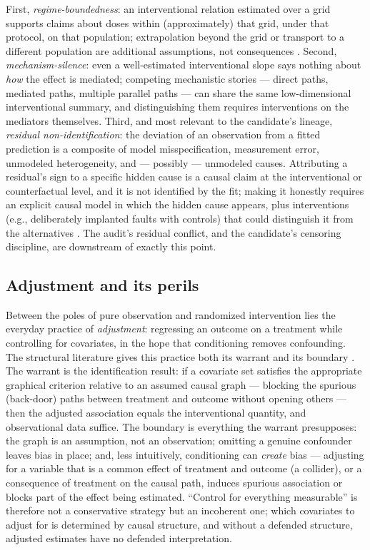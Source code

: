 First, \emph{regime-boundedness}: an interventional relation estimated over a grid supports claims about doses within (approximately) that grid, under that protocol, on that population; extrapolation beyond the grid or transport to a different population are additional assumptions, not consequences \cite{pearl}. Second, \emph{mechanism-silence}: even a well-estimated interventional slope says nothing about \emph{how} the effect is mediated; competing mechanistic stories --- direct paths, mediated paths, multiple parallel paths --- can share the same low-dimensional interventional summary, and distinguishing them requires interventions on the mediators themselves. Third, and most relevant to the candidate's lineage, \emph{residual non-identification}: the deviation of an observation from a fitted prediction is a composite of model misspecification, measurement error, unmodeled heterogeneity, and --- possibly --- unmodeled causes. Attributing a residual's sign to a specific hidden cause is a causal claim at the interventional or counterfactual level, and it is not identified by the fit; making it honestly requires an explicit causal model in which the hidden cause appears, plus interventions (e.g., deliberately implanted faults with controls) that could distinguish it from the alternatives \cite{pearl}. The audit's residual conflict, and the candidate's censoring discipline, are downstream of exactly this point.

\subsection{Adjustment and its perils}\label{ch02:causal:adjustment}

Between the poles of pure observation and randomized intervention lies the everyday practice of \emph{adjustment}: regressing an outcome on a treatment while controlling for covariates, in the hope that conditioning removes confounding. The structural literature gives this practice both its warrant and its boundary \cite{pearl}. The warrant is the identification result: if a covariate set satisfies the appropriate graphical criterion relative to an assumed causal graph --- blocking the spurious (back-door) paths between treatment and outcome without opening others --- then the adjusted association equals the interventional quantity, and observational data suffice. The boundary is everything the warrant presupposes: the graph is an assumption, not an observation; omitting a genuine confounder leaves bias in place; and, less intuitively, conditioning can \emph{create} bias --- adjusting for a variable that is a common effect of treatment and outcome (a collider), or a consequence of treatment on the causal path, induces spurious association or blocks part of the effect being estimated. ``Control for everything measurable'' is therefore not a conservative strategy but an incoherent one; which covariates to adjust for is determined by causal structure, and without a defended structure, adjusted estimates have no defended interpretation.

